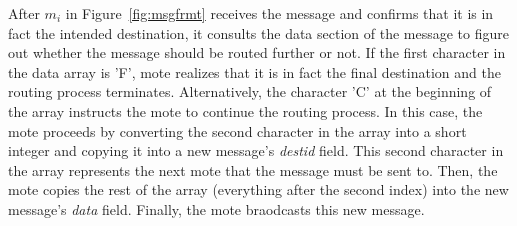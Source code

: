 \documentclass[11pt, titlepage, oneside]{article}
\begin{document}
After \begin{math}m_i\end{math} in Figure~\ref{fig:msgfrmt} receives the message and confirms that it is in fact the intended destination, it consults the data section of the message to figure out whether the message should be routed further or not. If the first character in the data array is 'F', mote realizes that it is in fact the final destination and the routing process terminates. Alternatively, the character 'C' at the beginning of the array instructs the mote to continue the routing process. In this case, the mote proceeds by converting the second character in the array into a short integer and copying it into a new message's {\it destid} field. This second character in the array  represents the next mote that the message must be sent to. Then, the mote copies the rest of the array (everything after the second index) into the new message's {\it data} field. Finally, the mote braodcasts this new message.\\ 
 
\end{document}
